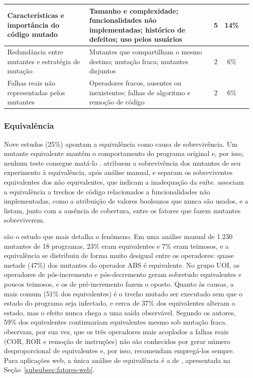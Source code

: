 \begin{table}[H]
\begin{tabular}{|p{3.0cm}|p{3.8cm}|c|c|p{4.3cm}|}
        Características e importância do código mutado & Tamanho e complexidade; funcionalidades não implementadas; histórico de defeitos; uso pelos usuários & 5 & 14\% & \cite{belli2011, inozemtseva2013, yao2014, ahmed2016, grano2019} \\
        \hline
        Redundância entre mutantes e estratégia de mutação & Mutantes que compartilham o mesmo destino; mutação fraca; mutantes disjuntos & 2 & 6\% & \cite{kintis2010, petrovic2021} \\
        \hline
        Falhas reais não representadas pelos mutantes & Operadores fracos, ausentes ou inexistentes; falhas de algoritmo e remoção de código & 2 & 6\% & \cite{just2014, petrovic2021} \\
        \hline
    \end{tabular}
\end{table}

\subsubsection{Equivalência}
\label{subsubsec:equivalencia}

Nove estudos (25\%) apontam a equivalência como causa de sobrevivência. Um mutante equivalente mantém o comportamento do programa original e, por isso, nenhum teste consegue matá-lo \cite{assylbekov2013, tao2025}.  atribuem a sobrevivência dos mutantes de seu experimento à equivalência, após análise manual, e  separam os sobreviventes equivalentes dos não equivalentes, que indicam a inadequação da suíte.  associam a equivalência a trechos de código relacionados a funcionalidades não implementadas, como a atribuição de valores booleanos que nunca são usados, e  a listam, junto com a ausência de cobertura, entre os fatores que fazem mutantes sobreviverem.

 são o estudo que mais detalha o fenômeno. Em uma análise manual de 1.230 mutantes de 18 programas, 23\% eram equivalentes e 7\% eram teimosos, e a equivalência se distribuiu de forma muito desigual entre os operadores: quase metade (47\%) dos mutantes do operador ABS é equivalente. No grupo UOI, os operadores de pós-incremento e pós-decremento geram sobretudo equivalentes e poucos teimosos, e os de pré-incremento fazem o oposto. Quanto às causas, a mais comum (51\% dos equivalentes) é o trecho mutado ser executado sem que o estado do programa seja infectado, e cerca de 37\% dos equivalentes alteram o estado, mas o efeito nunca chega a uma saída observável. Segundo os autores, 59\% dos equivalentes continuariam equivalentes mesmo sob mutação fraca.  observam, por sua vez, que os três operadores mais acoplados a falhas reais (COR, ROR e remoção de instruções) não são conhecidos por gerar número desproporcional de equivalentes e, por isso, recomendam empregá-los sempre. Para aplicações web, a única análise de equivalência é a de , apresentada na Seção~\ref{subsubsec:fatores-web}.

